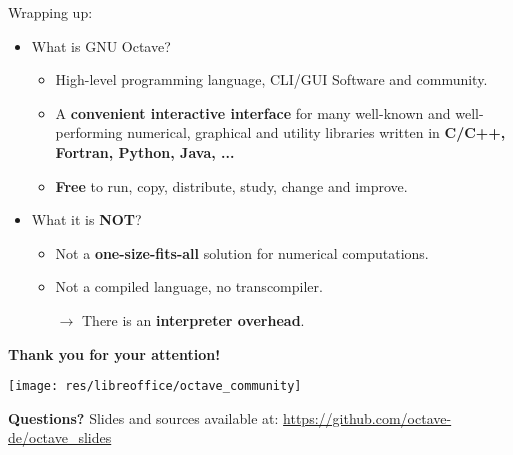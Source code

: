 \begin{frame}{Wrapping up:}
\begin{itemize}
\itemsep2em
\item
What is GNU Octave?
\begin{itemize}
\itemsep1em
\item
High-level programming language, CLI/GUI Software and community.

\item
A \textbf{convenient interactive interface}
for many well-known and well-performing
numerical, graphical and utility libraries
written in \textbf{C/C++, Fortran, Python, Java, ...}

\item
\textbf{Free} to run, copy, distribute, study, change and improve.
\end{itemize}

\item
What it is \textbf{NOT}?
\begin{itemize}
\itemsep1em
\item
Not a \textbf{one-size-fits-all} solution for numerical computations.

\item
Not a compiled language, no transcompiler.

$\rightarrow$ There is an \textbf{interpreter overhead}.
\end{itemize}
\end{itemize}
\end{frame}



\begin{frame}
\begin{center}
\textbf{\Large Thank you for your attention!}
\bigskip

\texttt{[image: res/libreoffice/octave\_community]}
\bigskip

\textbf{\Large Questions?}
\vfill\footnotesize
Slides and sources available at:
{\color{DarkBlue}\url{https://github.com/octave-de/octave_slides}}
\end{center}
\end{frame}
